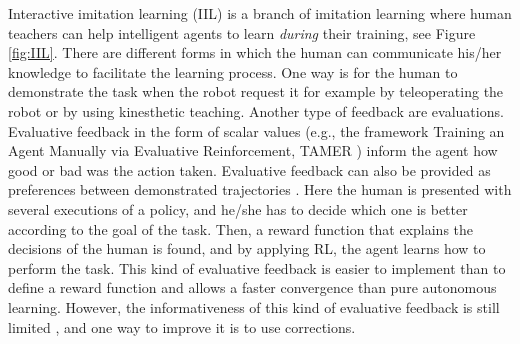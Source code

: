 


Interactive imitation learning (IIL) is a branch of imitation learning \cite{lazydagger:2021} where human teachers can help intelligent agents to learn \textit{during} their training, see Figure \ref{fig:IIL}. There are different forms in which the human can communicate his/her knowledge to facilitate the learning process. One way is for the human to demonstrate the task when the robot request it \cite{demonstration-robot-query} for example by teleoperating the robot or by using kinesthetic teaching. Another type of feedback are evaluations. Evaluative feedback in the form of scalar values (e.g., the framework Training an Agent Manually via Evaluative Reinforcement, TAMER \cite{TAMER-Knox-Stone:2009}) inform the agent how good or bad was the action taken. Evaluative feedback can also be provided as preferences between demonstrated trajectories \cite{learning-from-human-preferences:2018}. Here the human is presented with several executions of a policy, and he/she has to decide which one is better according to the goal of the task. Then, a reward function that explains the decisions of the human is found, and by applying RL, the agent learns how to perform the task. This kind of evaluative feedback is easier to implement than to define a reward function and allows a faster convergence than pure autonomous learning. However, the informativeness of this kind of evaluative feedback is still limited \cite{types-feedback-najar:2020}, and one way to improve it is to use corrections. 

